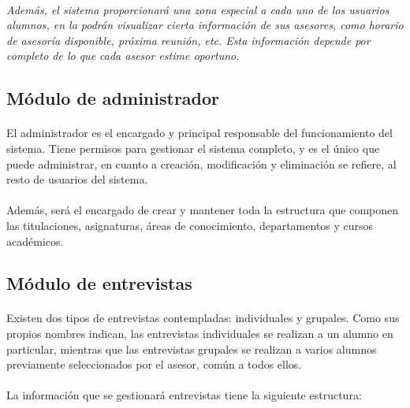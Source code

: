       \paragraph{}\textit{Además, el sistema proporcionará una zona especial
      a cada uno de los usuarios alumnos, en la podrán visualizar cierta
      información de sus asesores, como horario de asesoría disponible, próxima
      reunión, etc. Esta información depende por completo de lo que cada asesor
      estime oportuno.}


   \subsection{Módulo de administrador}

      \paragraph{}El administrador es el encargado y principal responsable
      del funcionamiento del sistema. Tiene permisos para gestionar el
      sistema completo, y es el único que puede administrar, en cuanto a
      creación, modificación y eliminación se refiere, al resto de usuarios
      del sistema.

      \paragraph{}Además, será el encargado de crear y mantener toda la
      estructura que componen las titulaciones, asignaturas, áreas de
      conocimiento, departamentos y cursos académicos.

   \subsection{Módulo de entrevistas}

      \paragraph{}Existen dos tipos de entrevistas contempladas: individuales y
      grupales. Como sus propios nombres indican, las entrevistas individuales
      se realizan a un alumno en particular, mientras que las entrevistas
      grupales se realizan a varios alumnos previamente seleccionados por el
      asesor, común a todos ellos.

      \paragraph{}La información que se gestionará entrevistas tiene la
      siguiente estructura:

